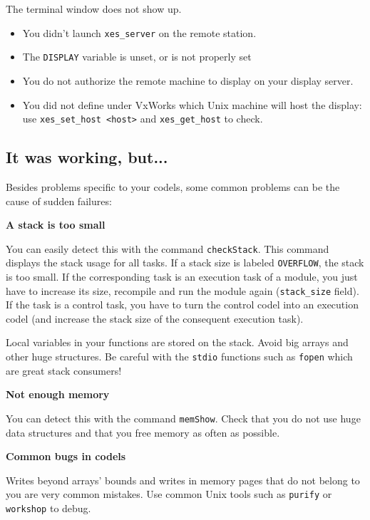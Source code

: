 The terminal window does not show up.
\begin{itemize}
\item You didn't launch {\tt xes\_server} on the remote station.
\item The {\tt DISPLAY} variable is unset, or is not properly set
\item You do not authorize the remote machine to display on your display
server. 
\item You did not define under VxWorks which Unix machine will host the
display:\\ use {\tt   xes\_set\_host <host>} and {\tt xes\_get\_host}  to
check.
\end{itemize}

\subsection{It was working, but...}

Besides problems specific to your codels, some common problems can be the
cause of sudden failures:

\bigbreak
{\bf A stack is too small}

You can easily   detect this  with the  command  {\tt checkStack}.   This
command displays  the stack  usage  for all tasks.    If a stack  size is
labeled {\tt OVERFLOW}, the stack is too small. If the corresponding task
is an execution  task of a module, you   just have to increase its  size,
recompile and run the module again ({\tt stack\_size} field). If the task
is a control task, you have to  turn the control  codel into an execution
codel (and increase the stack size of the consequent execution task).

Local variables in your  functions are stored   on the stack.  Avoid  big
arrays  and  other huge   structures.  Be  careful   with the {\tt stdio}
functions such as {\tt fopen} which are great stack consumers!


\bigbreak
{\bf Not enough memory}

You can detect this with the command {\tt memShow}. Check that you do not
use huge data structures and that you free memory as often as possible.


\bigbreak
{\bf Common bugs in codels}

Writes beyond  arrays'  bounds and  writes  in memory  pages  that do not
belong to you are  very common mistakes.   Use common Unix tools such  as
{\tt purify} or {\tt workshop} to debug.
